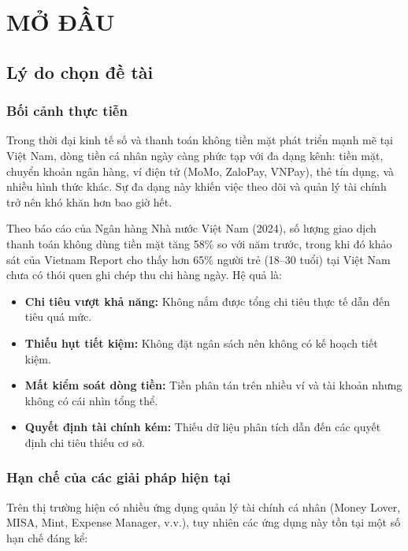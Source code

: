 \chapter{MỞ ĐẦU}

\section{Lý do chọn đề tài}

\subsection{Bối cảnh thực tiễn}

Trong thời đại kinh tế số và thanh toán không tiền mặt phát triển mạnh mẽ tại Việt Nam, dòng tiền cá nhân ngày càng phức tạp với đa dạng kênh: tiền mặt, chuyển khoản ngân hàng, ví điện tử (MoMo, ZaloPay, VNPay), thẻ tín dụng, và nhiều hình thức khác. Sự đa dạng này khiến việc theo dõi và quản lý tài chính trở nên khó khăn hơn bao giờ hết.

Theo báo cáo của Ngân hàng Nhà nước Việt Nam (2024), số lượng giao dịch thanh toán không dùng tiền mặt tăng 58\% so với năm trước, trong khi đó khảo sát của Vietnam Report cho thấy hơn 65\% người trẻ (18--30 tuổi) tại Việt Nam chưa có thói quen ghi chép thu chi hàng ngày. Hệ quả là:

\begin{itemize}
  \item \textbf{Chi tiêu vượt khả năng:} Không nắm được tổng chi tiêu thực tế dẫn đến tiêu quá mức.
  \item \textbf{Thiếu hụt tiết kiệm:} Không đặt ngân sách nên không có kế hoạch tiết kiệm.
  \item \textbf{Mất kiểm soát dòng tiền:} Tiền phân tán trên nhiều ví và tài khoản nhưng không có cái nhìn tổng thể.
  \item \textbf{Quyết định tài chính kém:} Thiếu dữ liệu phân tích dẫn đến các quyết định chi tiêu thiếu cơ sở.
\end{itemize}

\subsection{Hạn chế của các giải pháp hiện tại}

Trên thị trường hiện có nhiều ứng dụng quản lý tài chính cá nhân (Money Lover, MISA, Mint, Expense Manager, v.v.), tuy nhiên các ứng dụng này tồn tại một số hạn chế đáng kể:

